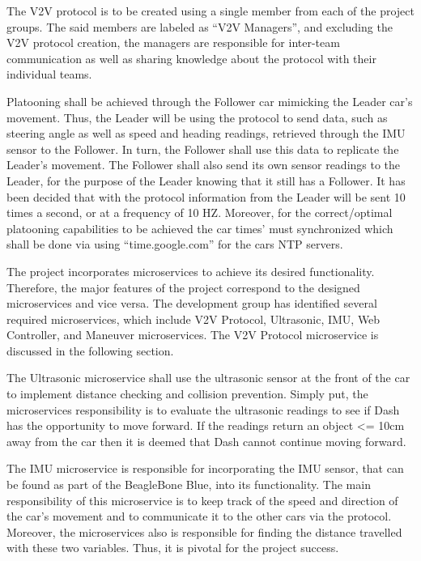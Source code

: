 \documentclass[12pt]{article}
\begin{document}
The V2V protocol is to be created using a single member from each of the project groups. The said members are labeled as “V2V Managers”, and excluding the V2V protocol creation, the managers are responsible for inter-team communication as well as sharing knowledge about the protocol with their individual teams. \par

Platooning shall be achieved through the Follower car mimicking the Leader car’s movement. Thus, the Leader will be using the protocol to send data, such as steering angle as well as speed and heading readings, retrieved through the IMU sensor to the Follower. In turn, the Follower shall use this data to replicate the Leader’s movement. The Follower shall also send its own sensor readings to the Leader, for the purpose of the Leader knowing that it still has a Follower. It has been decided that with the protocol information from the Leader will be sent 10 times a second, or at a frequency of 10 HZ. Moreover, for the correct/optimal platooning capabilities to be achieved the car times’ must synchronized which shall be done via using “time.google.com” for the cars NTP servers.\par
The project incorporates microservices to achieve its desired functionality. Therefore, the major features of the project correspond to the designed microservices and vice versa. The development group has identified several required microservices, which include V2V Protocol, Ultrasonic, IMU, Web Controller, and Maneuver microservices. The V2V Protocol microservice is discussed in the following section. \par

The Ultrasonic microservice shall use the ultrasonic sensor at the front of the car to implement distance checking and collision prevention. Simply put, the microservices responsibility is to evaluate the ultrasonic readings to see if Dash has the opportunity to move forward. If the readings return an object <= 10cm away from the car then it is deemed that Dash cannot continue moving forward. \par

The IMU microservice is responsible for incorporating the IMU sensor, that can be found as part of the BeagleBone Blue, into its functionality. The main responsibility of this microservice is to keep track of the speed and direction of the car’s movement and to communicate it to the other cars via the protocol. Moreover, the microservices also is responsible for finding the distance travelled with these two variables. Thus, it is pivotal for the project success. \par
\end{document}
